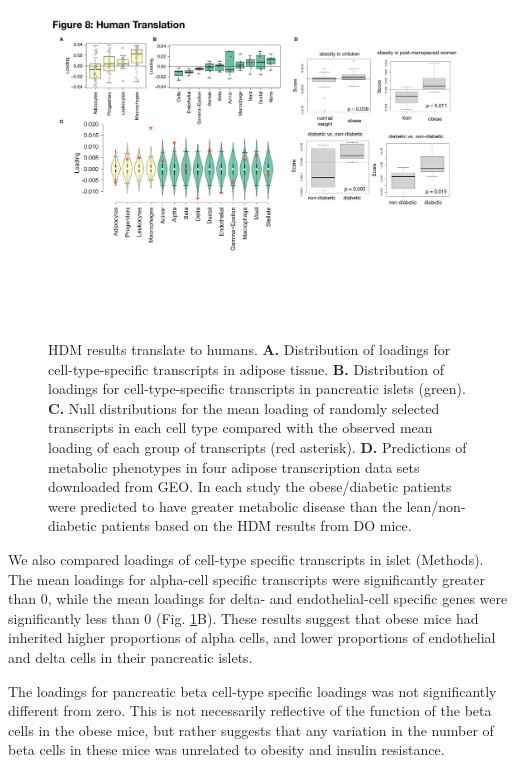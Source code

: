 \documentclass[
]{article}
\begin{document}
\begin{figure}[ht!]
\includegraphics[width=\textwidth]{Figures/Fig8_Human_Translation.pdf} 
\caption{HDM results translate to humans. \textbf{A.} Distribution of 
loadings for cell-type-specific transcripts in adipose tissue. \textbf{B.} 
Distribution of loadings for cell-type-specific transcripts in pancreatic 
islets (green). \textbf{C.} Null distributions for the mean loading of 
randomly selected transcripts in each cell type compared with the observed 
mean loading of each group of transcripts (red asterisk). \textbf{D.} 
Predictions of metabolic phenotypes in four adipose transcription data 
sets downloaded from GEO. In each study the obese/diabetic patients were 
predicted to have greater metabolic disease than the lean/non-diabetic 
patients based on the HDM results from DO mice.
}
\label{fig:human_translation}
\end{figure}

We also compared loadings of cell-type specific transcripts in islet
(Methods). The mean loadings for alpha-cell specific transcripts were
significantly greater than 0, while the mean loadings for delta- and
endothelial-cell specific genes were significantly less than 0 (Fig.
\ref{fig:human_translation}B). These results suggest that obese mice had
inherited higher proportions of alpha cells, and lower proportions of
endothelial and delta cells in their pancreatic islets.

The loadings for pancreatic beta cell-type specific loadings was not
significantly different from zero. This is not necessarily reflective of
the function of the beta cells in the obese mice, but rather suggests
that any variation in the number of beta cells in these mice was
unrelated to obesity and insulin resistance.
\end{document}
